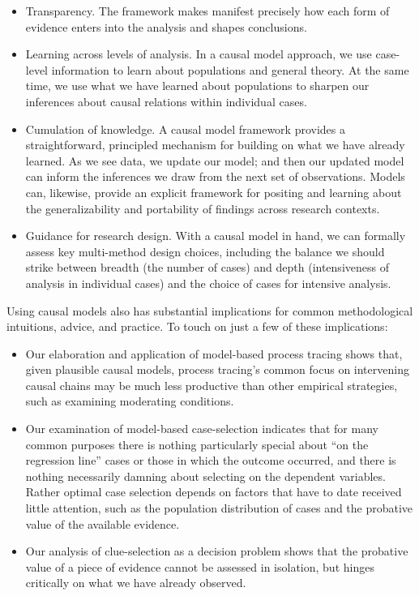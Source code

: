 \documentclass[
  12pt,
]{book}
\providecommand{\tightlist}{%
  \setlength{\itemsep}{0pt}\setlength{\parskip}{0pt}}
\begin{document}
\begin{itemize}
\tightlist
\item
  Transparency. The framework makes manifest precisely how each form of evidence enters into the analysis and shapes conclusions.
\end{itemize}

\begin{itemize}
\item
  Learning across levels of analysis. In a causal model approach, we use case-level information to learn about populations and general theory. At the same time, we use what we have learned about populations to sharpen our inferences about causal relations within individual cases.
\item
  Cumulation of knowledge. A causal model framework provides a straightforward, principled mechanism for building on what we have already learned. As we see data, we update our model; and then our updated model can inform the inferences we draw from the next set of observations. Models can, likewise, provide an explicit framework for positing and learning about the generalizability and portability of findings across research contexts.
\item
  Guidance for research design. With a causal model in hand, we can formally assess key multi-method design choices, including the balance we should strike between breadth (the number of cases) and depth (intensiveness of analysis in individual cases) and the choice of cases for intensive analysis.
\end{itemize}

Using causal models also has substantial implications for common methodological intuitions, advice, and practice. To touch on just a few of these implications:

\begin{itemize}
\item
  Our elaboration and application of model-based process tracing shows that, given plausible causal models, process tracing's common focus on intervening causal chains may be much less productive than other empirical strategies, such as examining moderating conditions.
\item
  Our examination of model-based case-selection indicates that for many common purposes there is nothing particularly special about ``on the regression line'' cases or those in which the outcome occurred, and there is nothing necessarily damning about selecting on the dependent variables. Rather optimal case selection depends on factors that have to date received little attention, such as the population distribution of cases and the probative value of the available evidence.
\item
  Our analysis of clue-selection as a decision problem shows that the probative value of a piece of evidence cannot be assessed in isolation, but hinges critically on what we have already observed.
\end{itemize}
\end{document}
